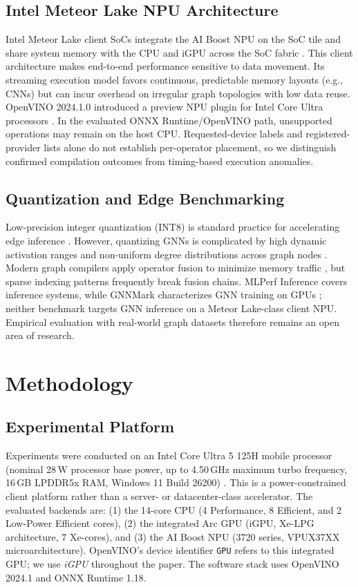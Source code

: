 \documentclass[conference]{IEEEtran}
\begin{document}
\subsection{Intel Meteor Lake NPU Architecture}
Intel Meteor Lake client SoCs integrate the AI Boost NPU on the SoC tile and share system memory with the CPU and iGPU across the SoC fabric \cite{intel_meteorlake_hotchips_2022, intel_core_ultra_npu}. This client architecture makes end-to-end performance sensitive to data movement. Its streaming execution model favors continuous, predictable memory layouts (e.g., CNNs) but can incur overhead on irregular graph topologies with low data reuse. OpenVINO 2024.1.0 introduced a preview NPU plugin for Intel Core Ultra processors \cite{openvino_npu_docs}. In the evaluated ONNX Runtime/OpenVINO path, unsupported operations may remain on the host CPU. Requested-device labels and registered-provider lists alone do not establish per-operator placement, so we distinguish confirmed compilation outcomes from timing-based execution anomalies.

\subsection{Quantization and Edge Benchmarking}
Low-precision integer quantization (INT8) is standard practice for accelerating edge inference \cite{jacob2018quantization}. However, quantizing GNNs is complicated by high dynamic activation ranges and non-uniform degree distributions across graph nodes \cite{tailor2021degreequant}. Modern graph compilers apply operator fusion to minimize memory traffic \cite{10.1145/3453483.3454083, 11181270}, but sparse indexing patterns frequently break fusion chains. MLPerf Inference covers inference systems, while GNNMark characterizes GNN training on GPUs \cite{mlperf_inference, 9408205}; neither benchmark targets GNN inference on a Meteor Lake-class client NPU. Empirical evaluation with real-world graph datasets \cite{hu2020open} therefore remains an open area of research.

\section{Methodology}

\subsection{Experimental Platform}
Experiments were conducted on an Intel Core Ultra 5 125H mobile processor (nominal 28\,W processor base power, up to 4.50\,GHz maximum turbo frequency, 16\,GB LPDDR5x RAM, Windows 11 Build 26200) \cite{intel_core_ultra_125h_specs}. This is a power-constrained client platform rather than a server- or datacenter-class accelerator. The evaluated backends are: (1) the 14-core CPU (4 Performance, 8 Efficient, and 2 Low-Power Efficient cores), (2) the integrated Arc GPU (iGPU, Xe-LPG architecture, 7 Xe-cores), and (3) the AI Boost NPU (3720 series, VPUX37XX microarchitecture). OpenVINO's device identifier \texttt{GPU} refers to this integrated GPU; we use \emph{iGPU} throughout the paper. The software stack uses OpenVINO 2024.1 and ONNX Runtime 1.18.
\end{document}
